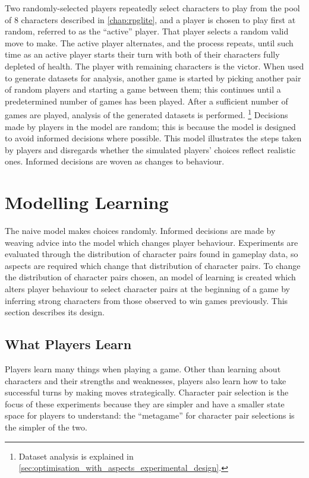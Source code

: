 
Two randomly-selected players repeatedly select characters to play from the pool
of 8 characters described in \cref{chap:rpglite}, and a player is chosen to play
first at random, referred to as the ``active'' player. That player selects a
random valid move to make. The active player alternates, and the process
repeats, until such time as an active player starts their turn with both of
their characters fully depleted of health. The player with remaining characters
is the victor. When used to generate datasets for analysis, another game is
started by picking another pair of random players and starting a game between
them; this continues until a predetermined number of games has been played.
After a sufficient number of games are played, analysis of the generated datasets
is performed. \footnote{Dataset analysis is explained in
\cref{sec:optimisation_with_aspects_experimental_design}.}
Decisions made by players in the model are random; this is because the model is
designed to avoid informed decisions where possible. This model illustrates the
steps taken by players and disregards whether the simulated players' choices
reflect realistic ones. Informed decisions are woven as \aspectoriented{}
changes to behaviour.





\section{Modelling Learning}\label{learning_model_definition}

The naive model makes choices randomly. Informed decisions are made by weaving
advice into the model which changes player behaviour. Experiments are evaluated
through the distribution of character pairs found in gameplay data, so aspects
are required which change that distribution of character pairs. To change the
distribution of character pairs chosen, an \aspectoriented{} model of learning
is created which alters player behaviour to select character pairs at the
beginning of a game by inferring strong characters from those observed to win
games previously. This section describes its design.

\subsection{What Players Learn}

Players learn many things when playing a game. Other than learning about
characters and their strengths and weaknesses, players also learn how to take
successful turns by making moves strategically. Character pair selection is the
focus of these experiments because they are simpler and have a smaller state
space for players to understand: the ``metagame'' for character pair selections
is the simpler of the two.

